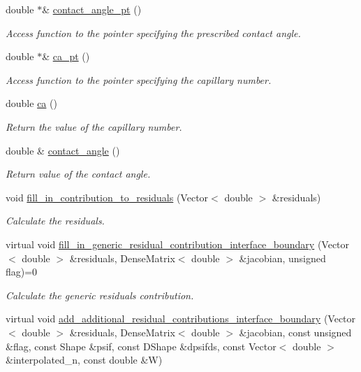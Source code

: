 \begin{DoxyCompactItemize}
double $\ast$\& \hyperlink{classoomph_1_1FluidInterfaceBoundingElement_a00fc3fdc8c3b7d149ba2c6de44f4a150}{contact\+\_\+angle\+\_\+pt} ()
\begin{DoxyCompactList}\small\item\em Access function to the pointer specifying the prescribed contact angle. \end{DoxyCompactList}\item 
double $\ast$\& \hyperlink{classoomph_1_1FluidInterfaceBoundingElement_acf132633ea7ed6b063c1f2a0a62d0b8c}{ca\+\_\+pt} ()
\begin{DoxyCompactList}\small\item\em Access function to the pointer specifying the capillary number. \end{DoxyCompactList}\item 
double \hyperlink{classoomph_1_1FluidInterfaceBoundingElement_ae5d097813762a2544d0b49c6e2fbaaac}{ca} ()
\begin{DoxyCompactList}\small\item\em Return the value of the capillary number. \end{DoxyCompactList}\item 
double \& \hyperlink{classoomph_1_1FluidInterfaceBoundingElement_a6803f4ea8de0b3fe17b703d7489c8147}{contact\+\_\+angle} ()
\begin{DoxyCompactList}\small\item\em Return value of the contact angle. \end{DoxyCompactList}\item 
void \hyperlink{classoomph_1_1FluidInterfaceBoundingElement_acaa709e7a402418fb03f2bf0f57f53ea}{fill\+\_\+in\+\_\+contribution\+\_\+to\+\_\+residuals} (Vector$<$ double $>$ \&residuals)
\begin{DoxyCompactList}\small\item\em Calculate the residuals. \end{DoxyCompactList}\item 
virtual void \hyperlink{classoomph_1_1FluidInterfaceBoundingElement_a69fa099e0cbfe8ae028a4edc77fedc60}{fill\+\_\+in\+\_\+generic\+\_\+residual\+\_\+contribution\+\_\+interface\+\_\+boundary} (Vector$<$ double $>$ \&residuals, Dense\+Matrix$<$ double $>$ \&jacobian, unsigned flag)=0
\begin{DoxyCompactList}\small\item\em Calculate the generic residuals contribution. \end{DoxyCompactList}\item 
virtual void \hyperlink{classoomph_1_1FluidInterfaceBoundingElement_a4510bd81b572d758694715f673080041}{add\+\_\+additional\+\_\+residual\+\_\+contributions\+\_\+interface\+\_\+boundary} (Vector$<$ double $>$ \&residuals, Dense\+Matrix$<$ double $>$ \&jacobian, const unsigned \&flag, const Shape \&psif, const D\+Shape \&dpsifds, const Vector$<$ double $>$ \&interpolated\+\_\+n, const double \&W)

\end{DoxyCompactItemize}
